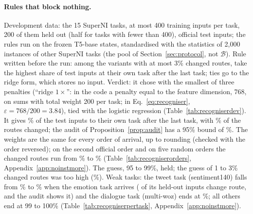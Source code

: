\paragraph{Rules that block nothing.} Development data: the 15 SuperNI tasks, at most 400 training inputs per task, 200 of them held out (half for tasks with fewer than 400), official test inputs; the rules run on the frozen T5-base states, standardised with the statistics of 2{,}000 instances of other SuperNI tasks (the pool of Section~\ref{sec:protocol}, not $\mathcal{B}$).
Rule written before the run: among the variants with at most 3\% changed routes, take the highest share of test inputs at their own task after the last task; ties go to the ridge form, which stores no input. Verdict: it chose \recog{} with the smallest of three penalties (``ridge $1\times$'': in the code a penalty equal to the feature dimension, 768, on sums with total weight 200 per task; in Eq.~\eqref{eq:recogniser}, $\varepsilon = 768/200 = 3.84$), tied with the logistic regression (Table~\ref{tab:recogniserdev}).
It gives \AudDevLLamOneEnd{}\% of the test inputs to their own task after the last task, with \AudDevLLamOneChanged{}\% of the routes changed; the audit of Proposition~\ref{prop:audit} has a 95\% bound of \AudDevLLamOneAuditBound{}\%. The weights are the same for every order of arrival, up to rounding (checked with the order reversed); on the second official order and on five random orders the changed routes run from \AudOrdRandTwoLChanged{}\% to \AudOrdTwoLChanged{}\% (Table~\ref{tab:recogniserorders}, Appendix~\ref{app:noinstmore}).
The guess, 95 to 99\%, held; the guess of 1 to 3\% changed routes was too high (\AudDevLLamOneChanged{}\%). Weak tasks: the tweet task (sentiment140) falls from \AudPtFourteenArrive{}\% to \AudPtFourteenEnd{}\% when the emotion task arrives (\AudPtFourteenC{} of its \AudPtFourteenM{} held-out inputs change route, and the audit shows it) and the dialogue task (multi-woz) ends at \AudPtSevenEnd{}\%; all others end at 99 to 100\% (Table~\ref{tab:recogniserpertask}, Appendix~\ref{app:noinstmore}).

\begin{table}[t]
  \caption{Rules that block nothing, development data: the 15 SuperNI tasks of order 1, frozen T5-base states, means over tasks, in \%. Own task at arrival and after the last task; route changed after the task arrived; audit $H/m$ and 95\% bound (Proposition~\ref{prop:audit}, held-out inputs); bound in advance (Theorem~\ref{thm:handicap} for \handicap{}; for the zone rule the line of the zone paragraph, not a theorem). $C$: inverse penalty of the logistic regression; ridge $1\times$, $10\times$, $100\times$: penalty of Eq.~\eqref{eq:recogniser} in multiples of the smallest; $r$: a new zone may hold at most $r-1$ held-out inputs of an older task. Bold: the variants used later. The last three rows are the first form of \handicap{}, without the floor at zero in Eq.~\eqref{eq:handicap}. The rows were compared on these tasks: development numbers.}
  \label{tab:recogniserdev}
  \centering
  
\end{table}

